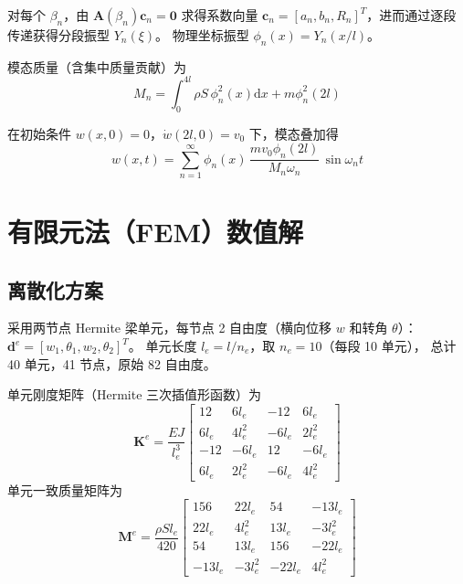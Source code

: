 \documentclass[twoside,12pt]{ctexart}
\newcommand{\dif}{\mathrm{d}}
\newcommand{\betan}{\beta_n}
\newcommand{\omegan}{\omega_n}
\begin{document}
对每个 $\betan$，由 $\mathbf{A}(\betan)\mathbf{c}_n=\mathbf{0}$ 求得系数向量
$\mathbf{c}_n=[a_n,b_n,R_n]^T$，进而通过逐段传递获得分段振型 $Y_n(\xi)$。
物理坐标振型 $\phi_n(x)=Y_n(x/l)$。

模态质量（含集中质量贡献）为
\begin{equation}\label{eq:Mn}
  M_n=\int_0^{4l}\rho S\,\phi_n^2(x)\dif x+m\phi_n^2(2l)
\end{equation}

在初始条件 $w(x,0)=0$，$\dot w(2l,0)=v_0$ 下，模态叠加得
\begin{equation}\label{eq:response}
  \boxed{\;w(x,t)=\sum_{n=1}^{\infty}\phi_n(x)\,
  \frac{m v_0\phi_n(2l)}{M_n\omegan}\,\sin\omegan t\;}
\end{equation}

\section{有限元法（FEM）数值解}

\subsection{离散化方案}

采用两节点 Hermite 梁单元，每节点 2 自由度（横向位移 $w$ 和转角 $\theta$）：
$\mathbf{d}^e=[w_1,\theta_1,w_2,\theta_2]^T$。
单元长度 $l_e=l/n_e$，取 $n_e=10$（每段 10 单元），
总计 40 单元，41 节点，原始 82 自由度。

单元刚度矩阵（Hermite 三次插值形函数）为
\begin{equation}\label{eq:Ke}
  \mathbf{K}^e=\frac{EJ}{l_e^3}
  \begin{bmatrix}
    12 & 6l_e & -12 & 6l_e\\
    6l_e & 4l_e^2 & -6l_e & 2l_e^2\\
    -12 & -6l_e & 12 & -6l_e\\
    6l_e & 2l_e^2 & -6l_e & 4l_e^2
  \end{bmatrix}
\end{equation}
单元一致质量矩阵为
\begin{equation}\label{eq:Me}
  \mathbf{M}^e=\frac{\rho S l_e}{420}
  \begin{bmatrix}
    156 & 22l_e & 54 & -13l_e\\
    22l_e & 4l_e^2 & 13l_e & -3l_e^2\\
    54 & 13l_e & 156 & -22l_e\\
    -13l_e & -3l_e^2 & -22l_e & 4l_e^2
  \end{bmatrix}
\end{equation}
\end{document}
